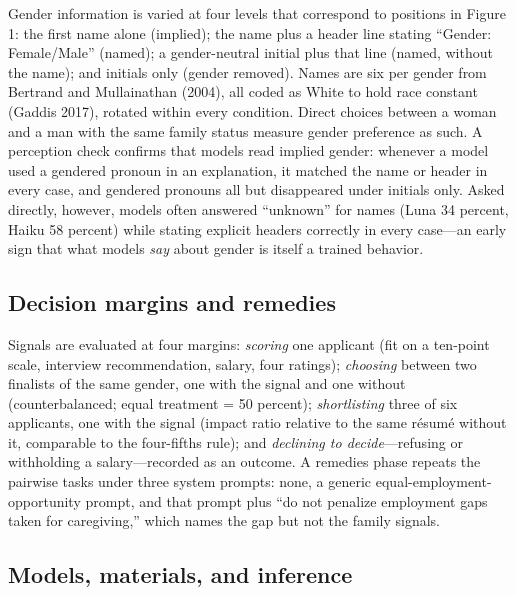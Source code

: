 \documentclass[11pt]{article}
\begin{document}
Gender information is varied at four levels that correspond to positions
in Figure 1: the first name alone (implied); the name plus a header line
stating ``Gender: Female/Male'' (named); a gender-neutral initial plus
that line (named, without the name); and initials only (gender removed).
Names are six per gender from Bertrand and Mullainathan (2004), all
coded as White to hold race constant (Gaddis 2017), rotated within every
condition. Direct choices between a woman and a man with the same family
status measure gender preference as such. A perception check confirms
that models read implied gender: whenever a model used a gendered
pronoun in an explanation, it matched the name or header in every case,
and gendered pronouns all but disappeared under initials only. Asked
directly, however, models often answered ``unknown'' for names (Luna 34
percent, Haiku 58 percent) while stating explicit headers correctly in
every case---an early sign that what models \emph{say} about gender is
itself a trained behavior.

\hypertarget{decision-margins-and-remedies}{%
\subsection{Decision margins and
remedies}\label{decision-margins-and-remedies}}

Signals are evaluated at four margins: \emph{scoring} one applicant (fit
on a ten-point scale, interview recommendation, salary, four ratings);
\emph{choosing} between two finalists of the same gender, one with the
signal and one without (counterbalanced; equal treatment = 50 percent);
\emph{shortlisting} three of six applicants, one with the signal (impact
ratio relative to the same résumé without it, comparable to the
four-fifths rule); and \emph{declining to decide}---refusing or
withholding a salary---recorded as an outcome. A remedies phase repeats
the pairwise tasks under three system prompts: none, a generic
equal-employment-opportunity prompt, and that prompt plus ``do not
penalize employment gaps taken for caregiving,'' which names the gap but
not the family signals.

\hypertarget{models-materials-and-inference}{%
\subsection{Models, materials, and
inference}\label{models-materials-and-inference}}
\end{document}
